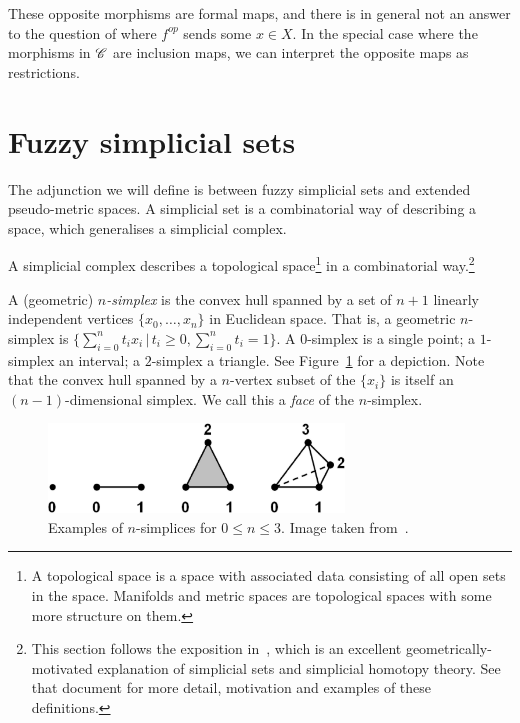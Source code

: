 \documentclass[a4paper,12pt,leqno]{article} \usepackage{amsmath}
\theoremstyle{definition}
\begin{document}
These opposite morphisms are formal maps, and there is in general not an answer
to the question of where $f^{op}$ sends some $x\in X$.
In the special case where the morphisms in $\mathscr{C}$ are inclusion maps, we can
interpret the opposite maps as restrictions.

\section{Fuzzy simplicial sets}
\label{section_fss}

The adjunction we will define is between fuzzy simplicial sets and extended
pseudo-metric spaces.
A simplicial set is a combinatorial way of describing
a space, which generalises a simplicial complex.

A simplicial complex describes a topological space\footnote{ A topological space
is a space with associated data consisting of all open sets in the space.
Manifolds and metric spaces are topological spaces with some more structure on
them.} in a combinatorial way.\footnote{ This section follows the exposition
in~\cite{Friedman08}, which is an excellent geometrically-motivated explanation
of simplicial sets and simplicial homotopy theory.
See that document for more
detail, motivation and examples of these definitions.}

A (geometric) \emph{$n$-simplex} is the convex hull spanned by a set of $n+1$
linearly independent vertices $\{x_0,\dots, x_n\}$ in Euclidean space.
That is,
a geometric $n$-simplex is $\{\sum_{i=0}^n t_ix_i\,|\, t_i\geq 0, \sum_{i=0}^n
t_i = 1\}$.
A $0$-simplex is a single point; a $1$-simplex an interval;
a $2$-simplex a triangle.
See Figure~\ref{fig_simplices} for a depiction.
Note
that the convex hull spanned by a $n$-vertex subset of the $\{x_i\}$ is itself
an $(n-1)$-dimensional simplex.
We call this a \emph{face} of the $n$-simplex.

\begin{figure} \centering
  \includegraphics[width=0.7\textwidth]{figures/simp2.jpg} \caption{Examples of
  $n$-simplices for $0\leq n\leq 3$.
  Image taken from~\cite{Friedman08}.}
\label{fig_simplices} \end{figure}
\end{document}
